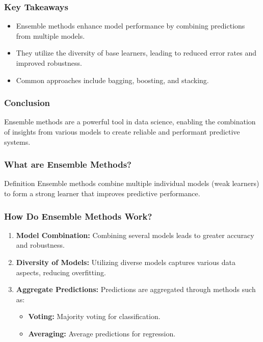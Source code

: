 \documentclass[aspectratio=169]{beamer}
\begin{document}
\begin{frame}[fragile]
    \frametitle{Key Takeaways}
    \begin{itemize}
        \item Ensemble methods enhance model performance by combining predictions from multiple models.
        \item They utilize the diversity of base learners, leading to reduced error rates and improved robustness.
        \item Common approaches include bagging, boosting, and stacking.
    \end{itemize}
\end{frame}

\begin{frame}[fragile]
    \frametitle{Conclusion}
    Ensemble methods are a powerful tool in data science, enabling the combination of insights from various models to create reliable and performant predictive systems.
\end{frame}

\begin{frame}[fragile]
    \frametitle{What are Ensemble Methods?}
    \begin{block}{Definition}
        Ensemble methods combine multiple individual models (weak learners) to form a strong learner that improves predictive performance.
    \end{block}
\end{frame}

\begin{frame}[fragile]
    \frametitle{How Do Ensemble Methods Work?}
    \begin{enumerate}
        \item \textbf{Model Combination:} Combining several models leads to greater accuracy and robustness.
        \item \textbf{Diversity of Models:} Utilizing diverse models captures various data aspects, reducing overfitting.
        \item \textbf{Aggregate Predictions:} Predictions are aggregated through methods such as:
        \begin{itemize}
            \item \textbf{Voting:} Majority voting for classification.
            \item \textbf{Averaging:} Average predictions for regression.
        \end{itemize}
    \end{enumerate}
\end{frame}
\end{document}
